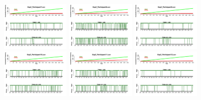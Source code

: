 \begin{figure}[th]
\includegraphics[width=0.30\textwidth]{Figures/Success_Exp2_P7} \includegraphics[width=0.30\textwidth]{Figures/Success_Exp2_P8} \includegraphics[width=0.30\textwidth]{Figures/Success_Exp2_P9}
\includegraphics[width=0.30\textwidth]{Figures/Success_Exp2_P10} \includegraphics[width=0.30\textwidth]{Figures/Success_Exp2_P11} \includegraphics[width=0.30\textwidth]{Figures/Success_Exp2_P12}

\end{figure}
